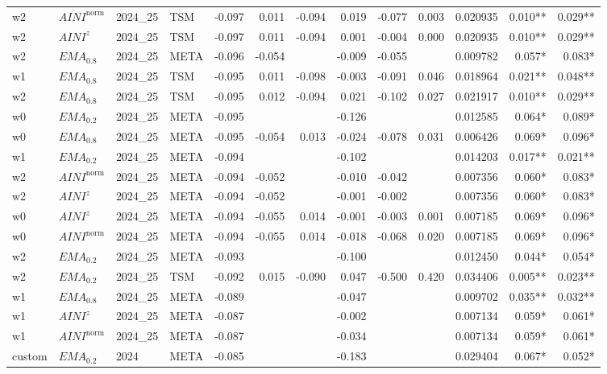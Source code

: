 \begin{longtable}{@{}llllrrrrrrrrr@{}}
w2 & $AINI^{\mathrm{norm}}$ & 2024\_25 & TSM & -0.097 & 0.011 & -0.094 & 0.019 & -0.077 & 0.003 & 0.020935 & 0.010** & 0.029** \\
w2 & $AINI^{z}$ & 2024\_25 & TSM & -0.097 & 0.011 & -0.094 & 0.001 & -0.004 & 0.000 & 0.020935 & 0.010** & 0.029** \\
w2 & $EMA_{0.8}$ & 2024\_25 & META & -0.096 & -0.054 &  & -0.009 & -0.055 &  & 0.009782 & 0.057* & 0.083* \\
w1 & $EMA_{0.8}$ & 2024\_25 & TSM & -0.095 & 0.011 & -0.098 & -0.003 & -0.091 & 0.046 & 0.018964 & 0.021** & 0.048** \\
w2 & $EMA_{0.8}$ & 2024\_25 & TSM & -0.095 & 0.012 & -0.094 & 0.021 & -0.102 & 0.027 & 0.021917 & 0.010** & 0.029** \\
w0 & $EMA_{0.2}$ & 2024\_25 & META & -0.095 &  &  & -0.126 &  &  & 0.012585 & 0.064* & 0.089* \\
w0 & $EMA_{0.8}$ & 2024\_25 & META & -0.095 & -0.054 & 0.013 & -0.024 & -0.078 & 0.031 & 0.006426 & 0.069* & 0.096* \\
w1 & $EMA_{0.2}$ & 2024\_25 & META & -0.094 &  &  & -0.102 &  &  & 0.014203 & 0.017** & 0.021** \\
w2 & $AINI^{\mathrm{norm}}$ & 2024\_25 & META & -0.094 & -0.052 &  & -0.010 & -0.042 &  & 0.007356 & 0.060* & 0.083* \\
w2 & $AINI^{z}$ & 2024\_25 & META & -0.094 & -0.052 &  & -0.001 & -0.002 &  & 0.007356 & 0.060* & 0.083* \\
w0 & $AINI^{z}$ & 2024\_25 & META & -0.094 & -0.055 & 0.014 & -0.001 & -0.003 & 0.001 & 0.007185 & 0.069* & 0.096* \\
w0 & $AINI^{\mathrm{norm}}$ & 2024\_25 & META & -0.094 & -0.055 & 0.014 & -0.018 & -0.068 & 0.020 & 0.007185 & 0.069* & 0.096* \\
w2 & $EMA_{0.2}$ & 2024\_25 & META & -0.093 &  &  & -0.100 &  &  & 0.012450 & 0.044* & 0.054* \\
w2 & $EMA_{0.2}$ & 2024\_25 & TSM & -0.092 & 0.015 & -0.090 & 0.047 & -0.500 & 0.420 & 0.034406 & 0.005** & 0.023** \\
w1 & $EMA_{0.8}$ & 2024\_25 & META & -0.089 &  &  & -0.047 &  &  & 0.009702 & 0.035** & 0.032** \\
w1 & $AINI^{z}$ & 2024\_25 & META & -0.087 &  &  & -0.002 &  &  & 0.007134 & 0.059* & 0.061* \\
w1 & $AINI^{\mathrm{norm}}$ & 2024\_25 & META & -0.087 &  &  & -0.034 &  &  & 0.007134 & 0.059* & 0.061* \\
custom & $EMA_{0.2}$ & 2024 & META & -0.085 &  &  & -0.183 &  &  & 0.029404 & 0.067* & 0.052* \\

\end{longtable}
